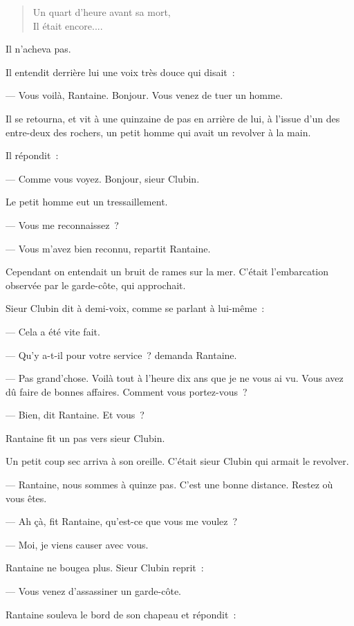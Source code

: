 \documentclass[french,twoside]{book} %
\begin{document}
\begin{verse}
Un quart d’heure avant sa mort,\\
Il était encore....\\
\end{verse}

\noindent Il n’acheva pas.\par
Il entendit derrière lui une voix très douce qui disait :\par
— Vous voilà, Rantaine. Bonjour. Vous venez de tuer un homme.\par
Il se retourna, et vit à une quinzaine de pas en arrière de lui, à l’issue d’un des entre-deux des rochers, un petit homme qui avait un revolver à la main.\par
Il répondit :\par
— Comme vous voyez. Bonjour, sieur Clubin.\par
Le petit homme eut un tressaillement.\par
— Vous me reconnaissez ?\par
— Vous m’avez bien reconnu, repartit Rantaine.\par
Cependant on entendait un bruit de rames sur la mer. C’était l’embarcation observée par le garde-côte, qui approchait.\par
Sieur Clubin dit à demi-voix, comme se parlant à lui-même :\par
— Cela a été vite fait.\par
— Qu’y a-t-il pour votre service ? demanda Rantaine.\par
— Pas grand’chose. Voilà tout à l’heure dix ans que je ne vous ai vu. Vous avez dû faire de bonnes affaires. Comment vous portez-vous ?\par
 — Bien, dit Rantaine. Et vous ?\par
Rantaine fit un pas vers sieur Clubin.\par
Un petit coup sec arriva à son oreille. C’était sieur Clubin qui armait le revolver.\par
— Rantaine, nous sommes à quinze pas. C’est une bonne distance. Restez où vous êtes.\par
— Ah çà, fit Rantaine, qu’est-ce que vous me voulez ?\par
— Moi, je viens causer avec vous.\par
Rantaine ne bougea plus. Sieur Clubin reprit :\par
— Vous venez d’assassiner un garde-côte.\par
Rantaine souleva le bord de son chapeau et répondit :\par
\end{document}
